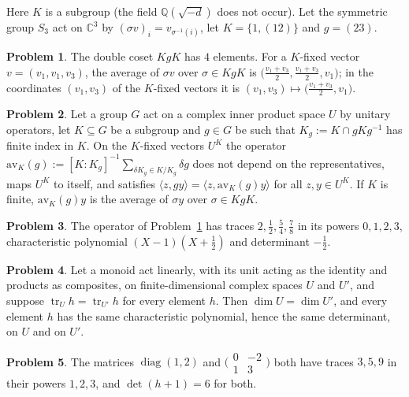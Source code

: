 \documentclass[reqno]{amsart}
\theoremstyle{plain}
\theoremstyle{definition}
\newtheorem{problem}{Problem}[section]
\newcommand{\Q}{\mathbb{Q}}
\newcommand{\C}{\mathbb{C}}
\newcommand{\tr}{\operatorname{tr}}
\begin{document}
Here \(K\) is a subgroup (the field \(\Q(\sqrt{-d})\) does not occur).  Let the symmetric group \(S_3\) act on \(\C^3\) by \((\sigma v)_i = v_{\sigma^{-1}(i)}\), let \(K = \{1, (12)\}\) and \(g = (23)\).

\begin{problem}\label{pr:s3-coset}
The double coset \(KgK\) has \(4\) elements.  For a \(K\)-fixed vector \(v = (v_1, v_1, v_3)\), the average of \(\sigma v\) over \(\sigma \in KgK\) is \(\bigl(\tfrac{v_1+v_3}2, \tfrac{v_1+v_3}2, v_1\bigr)\); in the coordinates \((v_1, v_3)\) of the \(K\)-fixed vectors it is \((v_1, v_3) \mapsto \bigl(\tfrac{v_1+v_3}2, v_1\bigr)\).
\end{problem}

\begin{problem}\label{pr:compress}
Let a group \(G\) act on a complex inner product space \(U\) by unitary operators, let \(K \subseteq G\) be a subgroup and \(g \in G\) be such that \(K_g := K \cap gKg^{-1}\) has finite index in \(K\).  On the \(K\)-fixed vectors \(U^K\) the operator \(\mathrm{av}_K(g) := [K : K_g]^{-1} \sum_{\delta K_g \in K/K_g} \delta g\) does not depend on the representatives, maps \(U^K\) to itself, and satisfies \(\langle z, gy \rangle = \langle z, \mathrm{av}_K(g) y\rangle\) for all \(z, y \in U^K\).  If \(K\) is finite, \(\mathrm{av}_K(g) y\) is the average of \(\sigma y\) over \(\sigma \in KgK\).
\end{problem}

\begin{problem}\label{pr:s3-traces}
The operator of Problem~\ref{pr:s3-coset} has traces \(2, \tfrac12, \tfrac54, \tfrac78\) in its powers \(0, 1, 2, 3\), characteristic polynomial \((X - 1)(X + \tfrac12)\) and determinant \(-\tfrac12\).
\end{problem}

\begin{problem}\label{pr:trace-charpoly}
Let a monoid act linearly, with its unit acting as the identity and products as composites, on finite-dimensional complex spaces \(U\) and \(U'\), and suppose \(\tr_U h = \tr_{U'} h\) for every element \(h\).  Then \(\dim U = \dim U'\), and every element \(h\) has the same characteristic polynomial, hence the same determinant, on \(U\) and on \(U'\).
\end{problem}

\begin{problem}\label{pr:trace-check}
The matrices \(\operatorname{diag}(1, 2)\) and \(\bigl(\begin{smallmatrix} 0 & -2 \\ 1 & 3 \end{smallmatrix}\bigr)\) both have traces \(3, 5, 9\) in their powers \(1, 2, 3\), and \(\det(h + 1) = 6\) for both.
\end{problem}
\end{document}
